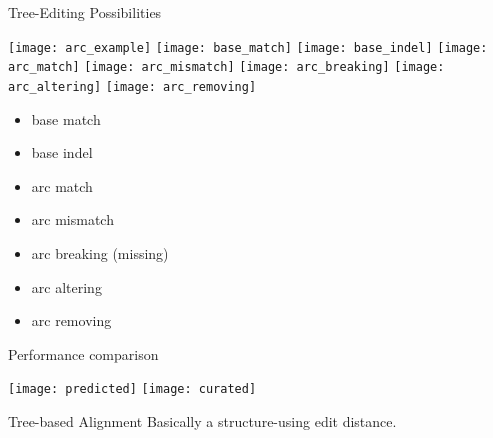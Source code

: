 \begin{frame}[c]{Tree-Editing Possibilities}
    \hspace{0mm}
    \begin{overprint}
    \centering\texttt{[image: arc\_example]}
    \centering\texttt{[image: base\_match]}
    \centering\texttt{[image: base\_indel]}
    \centering\texttt{[image: arc\_match]}
    \centering\texttt{[image: arc\_mismatch]}
    \centering\texttt{[image: arc\_breaking]}
    \centering\texttt{[image: arc\_altering]}
    \centering\texttt{[image: arc\_removing]}
    \end{overprint}

    \begin{multicols}{2}
    \begin{itemize}[<+(1)->]
        \item base match
        \item base indel
        \item arc match
        \item arc mismatch
        \item arc breaking (missing)
        \item arc altering
        \item arc removing
    \end{itemize}
    \end{multicols}
\end{frame}

\begin{frame}[c]{Performance comparison}
    \hspace{0mm}
    \begin{overprint}
    \centering\texttt{[image: predicted]}
    \centering\texttt{[image: curated]}
    \end{overprint}
\end{frame}


\begin{frame}[c]{Tree-based Alignment}
    \Large
    \pause
    Basically a structure-using edit distance.
\end{frame}

